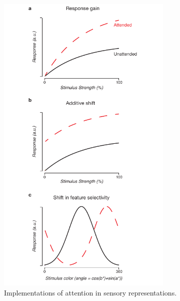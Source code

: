 \begin{figure}[ht]
\centering
\includegraphics[keepaspectratio,width=0.75\textwidth]{figs_c0/attention_models.pdf}
\caption[Sensory implementations of attention]{Implementations of attention in sensory representations. }
\label{fig:c0f3}
\end{figure}

